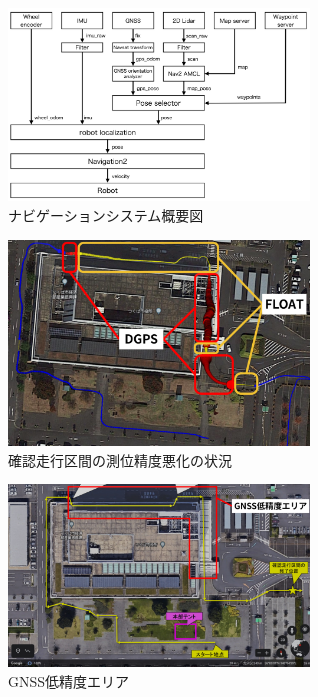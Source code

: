 \documentclass[platex,dvipdfmx]{rbproceedings}
\begin{document}
\begin{figure}[htbp]
    \centering   
    \includegraphics[keepaspectratio,width=80mm]{fig/system.png}
    \caption{ナビゲーションシステム概要図}
    \label{fig:system}
\end{figure}

\begin{figure}[htbp]
    \centering   
    \includegraphics[keepaspectratio,width=80mm]{fig/cityhall_fix.png}
    \caption{確認走行区間の測位精度悪化の状況}
    \label{fig:cityhall_fix}
\end{figure}

\begin{figure}[htbp]
    \centering   
    \includegraphics[keepaspectratio,width=80mm]{fig/weak_gnss_area.png}
    \caption{GNSS低精度エリア}
    \label{fig:no_gnss_area}
\end{figure}
\end{document}
